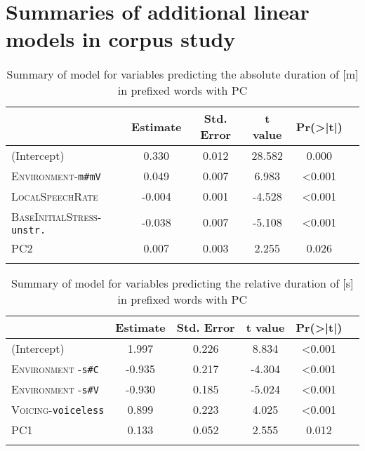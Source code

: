 \chapter{Summaries of additional linear models in corpus study}\label{Appendix D: model summaries corpus}

\begin{table}
	\caption{Summary of model for variables predicting the absolute duration of [m] in prefixed words with PC\label{model im PC Corpus abs}}
	\begin{tabularx}{\textwidth}{XSSSSS}
				\lsptoprule
		   & {Estimate} & {Std. Error} & {t value} & {Pr(>|t|)}  \\ \midrule
(Intercept)                        & 0.330 & 0.012 & 28.582 & 0.000 \\ 
\textsc{Environment}-\texttt{m\#mV}& 0.049 & 0.007 & 6.983 & <0.001\\ 
\textsc{LocalSpeechRate }& -0.004 & 0.001 & -4.528 & <0.001\\ 
\textsc{BaseInitialStress}-\texttt{unstr.} & -0.038 & 0.007 & -5.108 &  <0.001 \\ 
\textsc{PC2} & 0.007 & 0.003 & 2.255 & 0.026 \\
		\lspbottomrule 
			\end{tabularx}
\end{table}

\begin{table}
\caption{Summary of model for variables predicting the relative duration of [s] in prefixed words with PC\label{model dis PC Corpus rel}}
\begin{tabularx}{\textwidth}{XSSSSS}
\lsptoprule
		   & {Estimate} & {Std. Error} & {t value} & {Pr(>|t|)}  \\ \midrule
(Intercept) & 1.997 & 0.226 & 8.834 & <0.001  \\ 
\textsc{Environment} -\texttt{s\#C}  & -0.935 & 0.217 & -4.304 &<0.001  \\ 
\textsc{Environment} -\texttt{s\#V} & -0.930 & 0.185 & -5.024 & <0.001  \\ 
\textsc{Voicing}-\texttt{voiceless} & 0.899 & 0.223 & 4.025 &   <0.001 \\ 
\textsc{PC1} & 0.133 & 0.052 & 2.555 & 0.012 \\ 
		\lspbottomrule 
			\end{tabularx}
\end{table}


